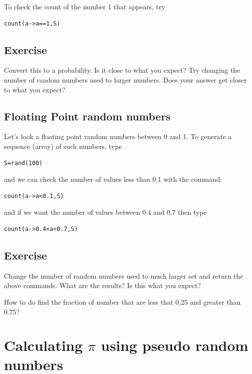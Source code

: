 To check the count of the number 1 that appears, try

\begin{verbatim}
count(a->a==1,S)
\end{verbatim}

\subsection{Exercise}

Convert this to a probability. Is it close to what you expect? Try
changing the number of random numbers used to larger numbers. Does your
answer get closer to what you expect?

\hypertarget{floating-point-random-numbers}{%
\subsection{Floating Point random
numbers}\label{floating-point-random-numbers}}

Let's look a floating point random numbers between 0 and 1. To generate
a sequence (array) of such numbers, type

\begin{verbatim}
S=rand(100)
\end{verbatim}

and we can check the number of values less than 0.1 with the command:

\begin{verbatim}
count(a->a<0.1,S)
\end{verbatim}

and if we want the number of values between 0.4 and 0.7 then type

\begin{verbatim}
count(a->0.4<a<0.7,S)
\end{verbatim}

\subsection{Exercise}

Change the number of random numbers used to much larger set and return
the above commands. What are the results? Is this what you expect?

How to do find the fraction of number that are less that 0.25 and
greater than 0.75?


\hypertarget{calculating-pi-using-pseudo-random-numbers}{%
\section{\texorpdfstring{Calculating $\pi$ using pseudo random
numbers}{Calculating \textbackslash pi using pseudo random numbers}}\label{calculating-pi-using-pseudo-random-numbers}}

